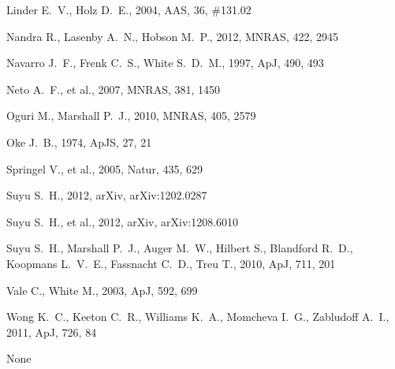\begin{thebibliography}{99}
 Linder E.~V., Holz D.~E., 2004, AAS, 36, \#131.02 


 Nandra R., Lasenby A.~N., Hobson M.~P., 2012, MNRAS, 422, 2945 


 Navarro J.~F., Frenk C.~S., White S.~D.~M., 1997, ApJ, 490, 493 


Neto A.~F., et al., 2007, MNRAS, 381, 1450 


 Oguri M., Marshall P.~J., 2010, MNRAS, 405, 2579 


 Oke 
J.~B., 1974, ApJS, 27, 21 


 Springel V., et al., 2005, Natur, 435, 629 


 Suyu 
S.~H., 2012, arXiv, arXiv:1202.0287 


Suyu S.~H., et al., 2012, arXiv, arXiv:1208.6010 


Suyu S.~H., Marshall P.~J., Auger M.~W., Hilbert S., Blandford R.~D., 
Koopmans L.~V.~E., Fassnacht C.~D., Treu T., 2010, ApJ, 711, 201 


 Vale C., White M., 2003, ApJ, 592, 699 


Wong K.~C., Keeton C.~R., Williams K.~A., Momcheva I.~G., Zabludoff A.~I., 
2011, ApJ, 726, 84 

None












\end{thebibliography}